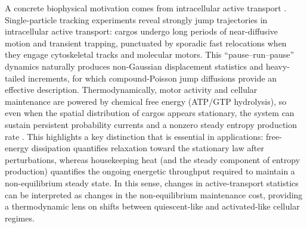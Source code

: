 \documentclass[10pt]{article}
\theoremstyle{definition}
\numberwithin{equation}{section}
\begin{document}
A concrete biophysical motivation comes from intracellular active transport \cite{briane2020,appert2015}. 
Single-particle tracking experiments reveal strongly jump trajectories in intracellular active transport: cargos undergo long periods of near-diffusive motion and transient trapping, punctuated by sporadic fast relocations when they engage cytoskeletal tracks and molecular motors. 
This ``pause--run--pause'' dynamics naturally produces non-Gaussian displacement statistics and heavy-tailed increments, for which compound-Poisson jump diffusions provide an effective description. 
Thermodynamically, motor activity and cellular maintenance are powered by chemical free energy (ATP/GTP hydrolysis), so even when the spatial distribution of cargos appears stationary, the system can sustain persistent probability currents and a nonzero steady entropy production rate \cite{vale1985,goychuk2014,reimann2002,goychuk2014plos}. 
This highlights a key distinction that is essential in applications: free-energy dissipation quantifies relaxation toward the stationary law after perturbations, whereas housekeeping heat (and the steady component of entropy production) quantifies the ongoing energetic throughput required to maintain a non-equilibrium steady state. 
In this sense, changes in active-transport statistics can be interpreted as changes in the non-equilibrium maintenance cost, providing a thermodynamic lens on shifts between quiescent-like and activated-like cellular regimes.
\end{document}

